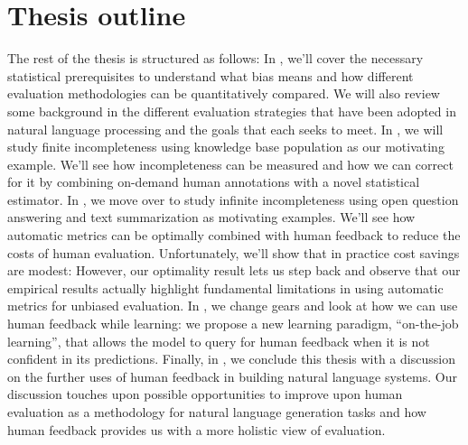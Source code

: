 \section{Thesis outline}
The rest of the thesis is structured as follows:
In , we'll cover the necessary statistical prerequisites to understand what bias means and how different evaluation methodologies can be quantitatively compared.
We will also review some background in the different evaluation strategies that have been adopted in natural language processing and the goals that each seeks to meet.
In , we will study finite incompleteness using knowledge base population as our motivating example.
We'll see how incompleteness can be measured and how we can correct for it by combining on-demand human annotations with a novel statistical estimator.
In , we move over to study infinite incompleteness using open question answering and text summarization as motivating examples.
We'll see how automatic metrics can be optimally combined with human feedback to reduce the costs of human evaluation.
Unfortunately, we'll show that in practice cost savings are modest: 
However, our optimality result lets us step back and observe that our empirical results actually highlight fundamental limitations in using automatic metrics for unbiased evaluation. 
In , we change gears and look at how we can use human feedback while learning: we propose a new learning paradigm, ``on-the-job learning'', that allows the model to query for human feedback when it is not confident in its predictions.
Finally, in , we conclude this thesis with a discussion on the further uses of human feedback in building natural language systems.
Our discussion touches upon possible opportunities to improve upon human evaluation as a methodology for natural language generation tasks and how human feedback provides us with a more holistic view of evaluation.

